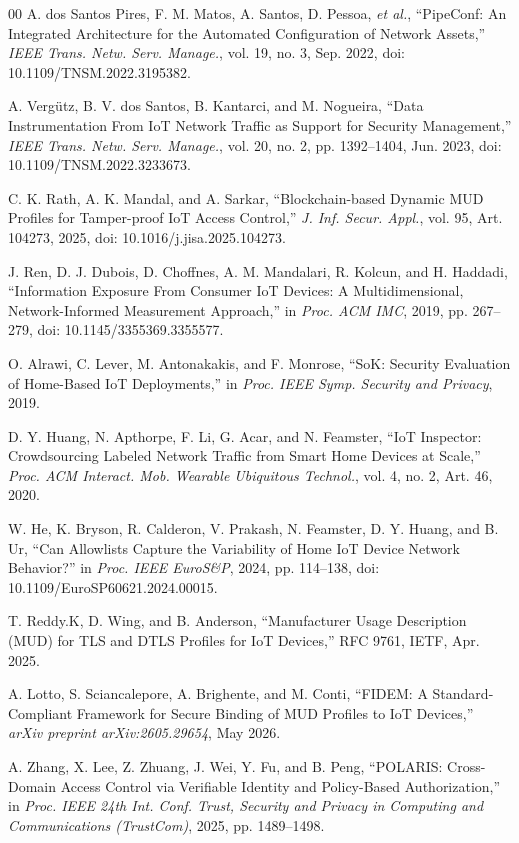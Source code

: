 \documentclass[journal]{IEEEtran}
\theoremstyle{definition}
\begin{document}
\begin{thebibliography}{00}
 A. dos Santos Pires, F. M. Matos, A. Santos, D. Pessoa,
\emph{et al.}, ``PipeConf: An Integrated Architecture for the Automated
Configuration of Network Assets,'' \emph{IEEE Trans. Netw. Serv. Manage.},
vol. 19, no. 3, Sep. 2022, doi: 10.1109/TNSM.2022.3195382.

 A. Verg\"utz, B. V. dos Santos, B. Kantarci, and
M. Nogueira, ``Data Instrumentation From IoT Network Traffic as Support for
Security Management,'' \emph{IEEE Trans. Netw. Serv. Manage.}, vol. 20, no. 2,
pp. 1392--1404, Jun. 2023, doi: 10.1109/TNSM.2022.3233673.

 C. K. Rath, A. K. Mandal, and A. Sarkar, ``Blockchain-based
Dynamic MUD Profiles for Tamper-proof IoT Access Control,'' \emph{J. Inf. Secur. Appl.},
vol. 95, Art. 104273, 2025, doi: 10.1016/j.jisa.2025.104273.

 J. Ren, D. J. Dubois, D. Choffnes, A. M. Mandalari, R. Kolcun, and
H. Haddadi, ``Information Exposure From Consumer IoT Devices: A Multidimensional,
Network-Informed Measurement Approach,'' in \emph{Proc. ACM IMC}, 2019,
pp. 267--279, doi: 10.1145/3355369.3355577.

 O. Alrawi, C. Lever, M. Antonakakis, and F. Monrose,
``SoK: Security Evaluation of Home-Based IoT Deployments,'' in \emph{Proc. IEEE
Symp. Security and Privacy}, 2019.

 D. Y. Huang, N. Apthorpe, F. Li, G. Acar, and N. Feamster,
``IoT Inspector: Crowdsourcing Labeled Network Traffic from Smart Home Devices at
Scale,'' \emph{Proc. ACM Interact. Mob. Wearable Ubiquitous Technol.}, vol. 4,
no. 2, Art. 46, 2020.

 W. He, K. Bryson, R. Calderon, V. Prakash,
N. Feamster, D. Y. Huang, and B. Ur, ``Can Allowlists Capture the Variability
of Home IoT Device Network Behavior?'' in \emph{Proc. IEEE EuroS\&P}, 2024,
pp. 114--138, doi: 10.1109/EuroSP60621.2024.00015.

 T. Reddy.K, D. Wing, and B. Anderson, ``Manufacturer Usage Description
(MUD) for TLS and DTLS Profiles for IoT Devices,'' RFC 9761, IETF, Apr. 2025.

 A. Lotto, S. Sciancalepore, A. Brighente, and M. Conti, ``FIDEM: A
Standard-Compliant Framework for Secure Binding of MUD Profiles to IoT Devices,''
\emph{arXiv preprint arXiv:2605.29654}, May 2026.

 A. Zhang, X. Lee, Z. Zhuang, J. Wei, Y. Fu, and B. Peng, ``POLARIS:
Cross-Domain Access Control via Verifiable Identity and Policy-Based Authorization,''
in \emph{Proc. IEEE 24th Int. Conf. Trust, Security and Privacy in Computing and
Communications (TrustCom)}, 2025, pp. 1489--1498.


\end{thebibliography}
\end{document}
